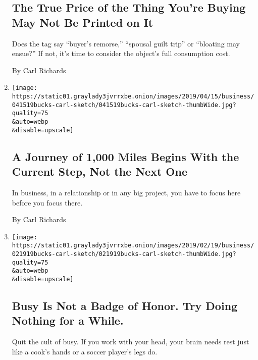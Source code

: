 \begin{enumerate}
  \hypertarget{the-true-price-of-the-thing-youre-buying-may-not-be-printed-on-it}{%
  \subsection{The True Price of the Thing You're Buying May Not Be
  Printed on
  It}\label{the-true-price-of-the-thing-youre-buying-may-not-be-printed-on-it}}

  Does the tag say ``buyer's remorse,'' ``spousal guilt trip'' or
  ``bloating may ensue?'' If not, it's time to consider the object's
  full consumption cost.

  By Carl Richards
\item
  \href{/2019/04/17/your-money/one-step-at-a-time.html}{}

  \texttt{[image: https://static01.graylady3jvrrxbe.onion/images/2019/04/15/business/041519bucks-carl-sketch/041519bucks-carl-sketch-thumbWide.jpg?quality=75\\\&auto=webp\\\&disable=upscale]}

  \hypertarget{a-journey-of-1000-miles-begins-with-the-current-step-not-the-next-one}{%
  \subsection{A Journey of 1,000 Miles Begins With the Current Step, Not
  the Next
  One}\label{a-journey-of-1000-miles-begins-with-the-current-step-not-the-next-one}}

  In business, in a relationship or in any big project, you have to
  focus here before you focus there.

  By Carl Richards
\item
  \href{/2019/02/19/your-money/sketch-guy-knowledge-workers-need-rest.html}{}

  \texttt{[image: https://static01.graylady3jvrrxbe.onion/images/2019/02/19/business/021919bucks-carl-sketch/021919bucks-carl-sketch-thumbWide.jpg?quality=75\\\&auto=webp\\\&disable=upscale]}

  \hypertarget{busy-is-not-a-badge-of-honor-try-doing-nothing-for-a-while}{%
  \subsection{Busy Is Not a Badge of Honor. Try Doing Nothing for a
  While.}\label{busy-is-not-a-badge-of-honor-try-doing-nothing-for-a-while}}

  Quit the cult of busy. If you work with your head, your brain needs
  rest just like a cook's hands or a soccer player's legs do.


\end{enumerate}
